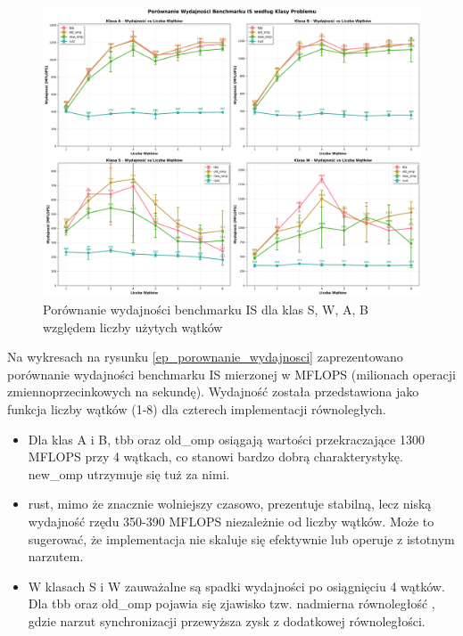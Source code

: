 \begin{figure}[H]
    \centering
    \includegraphics[width=\textwidth]{analiza/images/parallel/is/is_porownanie_wydajnosci.png}
    \caption{Porównanie wydajności benchmarku IS dla klas S, W, A, B względem liczby użytych wątków}
    \label{is_porownanie_wydajnosci}
\end{figure}
Na wykresach na rysunku \ref{ep_porownanie_wydajnosci} zaprezentowano porównanie wydajności benchmarku IS mierzonej w MFLOPS (milionach operacji zmiennoprzecinkowych na sekundę). Wydajność została przedstawiona jako funkcja liczby wątków (1-8) dla czterech implementacji równoległych.
\begin{itemize}
    \item Dla klas A i B, tbb oraz old\_omp osiągają wartości przekraczające 1300 MFLOPS przy 4 wątkach, co stanowi bardzo dobrą charakterystykę. new\_omp utrzymuje się tuż za nimi.
    \item rust, mimo że znacznie wolniejszy czasowo, prezentuje stabilną, lecz niską wydajność rzędu 350-390 MFLOPS niezależnie od liczby wątków. Może to sugerować, że implementacja nie skaluje się efektywnie lub operuje z istotnym narzutem.
    \item W klasach S i W zauważalne są spadki wydajności po osiągnięciu 4 wątków. Dla tbb oraz old\_omp pojawia się zjawisko tzw. nadmierna równoległość , gdzie narzut synchronizacji przewyższa zysk z dodatkowej równoległości.
\end{itemize}



